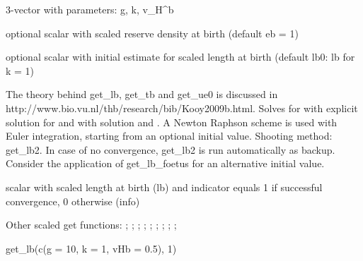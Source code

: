 \documentclass[a4paper]{book}
\begin{document}
%
\begin{Arguments}
\begin{ldescription}
\item[\code{pars}] 3-vector with parameters: g, k, v\_H\textasciicircum{}b

\item[\code{eb}] optional scalar with scaled reserve density at birth (default eb = 1)

\item[\code{lb0}] optional scalar with initial estimate for scaled length at birth (default lb0: lb for k = 1)
\end{ldescription}
\end{Arguments}
%
\begin{Details}\relax
The theory behind get\_lb, get\_tb and get\_ue0 is discussed in http://www.bio.vu.nl/thb/research/bib/Kooy2009b.html.
Solves   for  with explicit solution for 
and 
with solution 
and .
A Newton Raphson scheme is used with Euler integration, starting from an optional initial value.
Shooting method: get\_lb2.
In case of no convergence, get\_lb2 is run automatically as backup.
Consider the application of get\_lb\_foetus for an alternative initial value.
\end{Details}
%
\begin{Value}
scalar with scaled length at birth (lb) and indicator equals 1 if successful convergence, 0 otherwise (info)
\end{Value}
%
\begin{SeeAlso}\relax
Other scaled get functions: ;
; ;
; ;
; ;
;
;
\end{SeeAlso}
%
\begin{Examples}
\begin{ExampleCode}
get_lb(c(g = 10, k = 1, vHb = 0.5), 1)
\end{ExampleCode}
\end{Examples}
\end{document}
